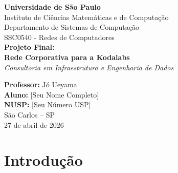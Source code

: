 \documentclass[12pt,a4paper]{article}
\begin{document}
\begin{titlepage}
    \centering
    \vspace*{1.5cm}
    
    \vspace{1cm}
    
    {\LARGE \textbf{Universidade de São Paulo}}\\[0.3cm]
    {\large Instituto de Ciências Matemáticas e de Computação}\\[0.2cm]
    {\large Departamento de Sistemas de Computação}\\[0.2cm]
    {\large SSC0540 - Redes de Computadores}\\[3.5cm]
    
    {\Huge \textbf{Projeto Final:}}\\[0.8cm]
    {\LARGE \textbf{Rede Corporativa para a Kodalabs}}\\[0.3cm]
    {\large \textit{Consultoria em Infraestrutura e Engenharia de Dados}}\\[5cm]
    
    \vfill
    
    {\large \textbf{Professor:} Jó Ueyama}\\[0.3cm]
    {\large \textbf{Aluno:} [Seu Nome Completo]}\\[0.2cm]
    {\large \textbf{NUSP:} [Seu Número USP]}\\[2cm]
    
    {\large São Carlos -- SP}\\
    {\large 27 de abril de 2026}
\end{titlepage}

\tableofcontents
\newpage

\section{Introdução}
\end{document}
